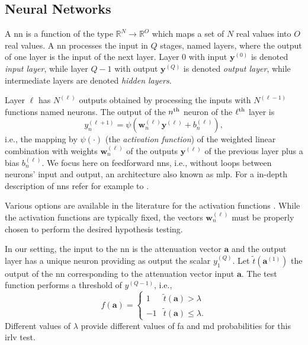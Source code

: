 \documentclass[draftcls,onecolumn,12pt]{IEEEtran}
\begin{document}
\subsection{Neural Networks}\label{sec:nn}

A \ac{nn} is a function of the type $\mathbb{R}^N \to \mathbb{R}^O$ which maps a set of $N$ real values into $O$ real values. A \ac{nn} processes the input in $Q$ stages, named layers, where the output of one layer is the input of the next layer. Layer $0$ with input $\bm{y}^{(0)}$ is denoted {\em input layer}, while layer $Q-1$ with output $\bm{y}^{(Q)}$ is denoted {\em output layer}, while intermediate layers are denoted {\em hidden layers}. 

Layer $\ell$ has $N^{(\ell)}$ outputs obtained by processing the inputs with $N^{(\ell-1)}$ functions named neurons. The output of the $n^{\rm th}$ neuron of the $\ell^{\rm th}$ layer is
\begin{equation}\label{eq:nonLin}
y_n^{(\ell+1)} = \psi\left( \bm{w}_n^{(\ell)}\bm{y}^{(\ell)}+b_n^{(\ell)} \right),
\end{equation}
i.e., the mapping by $\psi(\cdot)$ (the {\em activation function}) of the weighted linear combination with weights $\bm{w}_n^{(\ell)}$ of the outputs $\bm{y}^{(\ell)}$ of the previous layer plus a bias $b_n^{(\ell)}$. We focus here on feedforward \acp{nn}, i.e., without loops between neurons' input and output, an architecture  also known as \ac{mlp}. For a in-depth description of \acp{nn} refer for example to \cite{goodfellow}.

Various options are available in the literature for the activation functions \cite{goodfellow}. While the activation functions are typically fixed, the vectors $\bm{w}_n^{(\ell)}$ must be properly chosen to perform the desired hypothesis testing. 

In our setting, the input to the \ac{nn} is the attenuation vector $\bm{a}$ and the output layer has a unique neuron providing as output the scalar $y^{(Q)}_1$. Let $\tilde{t}(\bm{a}^{(1)})$ the output of the \ac{nn} corresponding to the attenuation vector input $\bm{a}$. The test function performs a threshold of $y^{(Q-1)}$, i.e.,
\begin{equation}
\label{testfunNN}
    f(\bm{a}) = \begin{cases}
    1 & \tilde{t}(\bm{a}) > \lambda \\
    -1 & \tilde{t}(\bm{a}) \leq \lambda.
    \end{cases}
\end{equation}
Different values of $\lambda$ provide different values of \ac{fa} and \ac{md} probabilities for this \ac{irlv} test.
   
\end{document}
